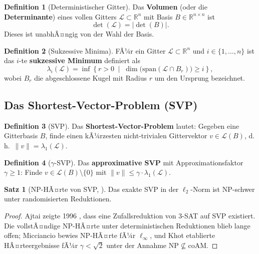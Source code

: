 ﻿\documentclass[a4paper,12pt]{article}
\theoremstyle{definition}
\newtheorem{definition}{Definition}[section]
\newtheorem{satz}{Satz}[section]
\begin{document}
\begin{definition}[Deterministischer Gitter]
Das \textbf{Volumen} (oder die \textbf{Determinante}) eines vollen Gitters
$\mathcal{L} \subset \mathbb{R}^n$ mit Basis $B \in \mathbb{R}^{n \times n}$ ist
\[
  \det(\mathcal{L}) = |\det(B)|.
\]
Dieses ist unabhÃ¤ngig von der Wahl der Basis.
\end{definition}

\begin{definition}[Sukzessive Minima]
FÃ¼r ein Gitter $\mathcal{L} \subset \mathbb{R}^n$ und $i \in \{1, \ldots, n\}$
ist das $i$-te \textbf{sukzessive Minimum} definiert als
\[
  \lambda_i(\mathcal{L}) = \inf \left\{ r > 0 \;\middle|\; \dim\bigl(\mathrm{span}(\mathcal{L} \cap B_r)\bigr) \geq i \right\},
\]
wobei $B_r$ die abgeschlossene Kugel mit Radius $r$ um den Ursprung bezeichnet.
\end{definition}

\subsection{Das Shortest-Vector-Problem (SVP)}

\begin{definition}[SVP]
Das \textbf{Shortest-Vector-Problem} lautet: Gegeben eine Gitterbasis $B$,
finde einen kÃ¼rzesten nicht-trivialen Gittervektor $v \in \mathcal{L}(B)$,
d.\,h.\ $\|v\| = \lambda_1(\mathcal{L})$.
\end{definition}

\begin{definition}[$\gamma$-SVP]
Das \textbf{approximative SVP} mit Approximationsfaktor $\gamma \geq 1$:
Finde $v \in \mathcal{L}(B) \setminus \{0\}$ mit $\|v\| \leq \gamma \cdot \lambda_1(\mathcal{L})$.
\end{definition}

\begin{satz}[NP-HÃ¤rte von SVP, \cite{Aro97}]
Das exakte SVP in der $\ell_2$-Norm ist NP-schwer unter randomisierten Reduktionen.
\end{satz}

\begin{proof}
Ajtai zeigte 1996 \cite{Ajt96}, dass eine Zufallsreduktion von 3-SAT auf SVP existiert.
Die vollstÃ¤ndige NP-HÃ¤rte unter deterministischen Reduktionen blieb lange offen;
Micciancio \cite{Mic01} bewies NP-HÃ¤rte fÃ¼r $\ell_\infty$, und Khot \cite{Kho05}
etablierte HÃ¤rteergebnisse fÃ¼r $\gamma < \sqrt{2}$ unter der Annahme $\mathrm{NP} \not\subseteq \mathrm{coAM}$.
\end{proof}
\end{document}
